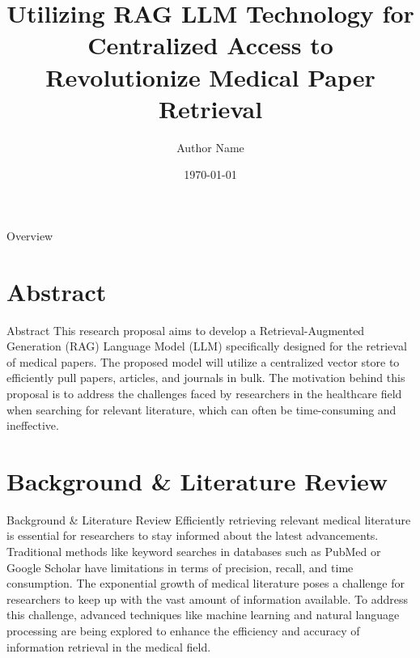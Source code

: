 \documentclass{beamer}
\title{Utilizing RAG LLM Technology for Centralized Access to Revolutionize Medical Paper Retrieval}
\author{Author Name}
\date{\today}
\begin{document}
\begin{frame}
\titlepage
\end{frame}

\begin{frame}{Overview}
\tableofcontents
\end{frame}

\section{Abstract}
\begin{frame}{Abstract}
This research proposal aims to develop a Retrieval-Augmented Generation (RAG) Language Model (LLM) specifically designed for the retrieval of medical papers. The proposed model will utilize a centralized vector store to efficiently pull papers, articles, and journals in bulk. The motivation behind this proposal is to address the challenges faced by researchers in the healthcare field when searching for relevant literature, which can often be time-consuming and ineffective.
\end{frame}

\section{Background \& Literature Review}
\begin{frame}{Background \& Literature Review}
Efficiently retrieving relevant medical literature is essential for researchers to stay informed about the latest advancements. Traditional methods like keyword searches in databases such as PubMed or Google Scholar have limitations in terms of precision, recall, and time consumption. The exponential growth of medical literature poses a challenge for researchers to keep up with the vast amount of information available. To address this challenge, advanced techniques like machine learning and natural language processing are being explored to enhance the efficiency and accuracy of information retrieval in the medical field.
\end{frame}
\end{document}

